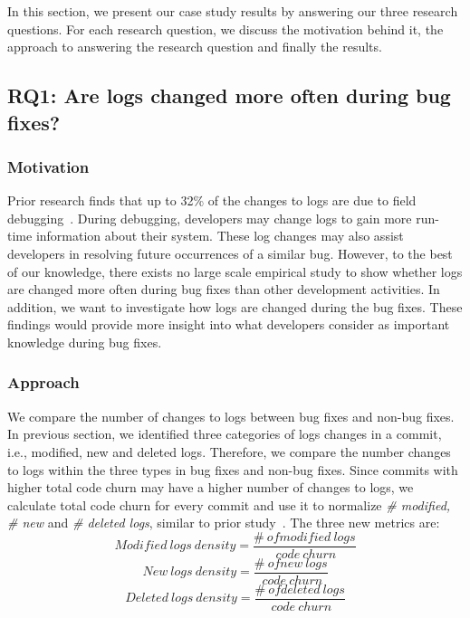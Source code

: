 	In this section, we present our case study results by answering our three research questions. For each research question, we discuss the motivation behind it, the approach to answering the research question and finally the results.

\subsection*{RQ1: Are logs changed more often during bug fixes?}


\subsubsection*{Motivation}

Prior research finds that up to 32\% of the changes to logs are due to field debugging~\cite{EMSEIAN}. During debugging, developers may change logs to gain more run-time information about their system. These log changes may also assist developers in resolving future occurrences of a similar bug. However, to the best of our knowledge, there exists no large scale empirical study to show whether logs are changed more often during bug fixes than other development activities. In addition, we want to investigate how logs are changed during the bug fixes. These findings would provide more insight into what developers consider as important knowledge during bug fixes.

\subsubsection*{Approach}

We compare the number of changes to logs between bug fixes and non-bug fixes. In previous section, we identified three categories of logs changes in a commit, i.e., modified, new and deleted logs. Therefore, we compare the number changes to logs within the three types in bug fixes and non-bug fixes. Since commits with higher total code churn may have a higher number of changes to logs, we calculate total code churn for every commit and use it to normalize \emph{\# modified, \# new} and \emph{\# deleted logs}, similar to prior study~\cite{Characterizinglogs}. The three new metrics are:
\begin{equation}
Modified\ logs\ density = \frac{\#\ of modified\ logs}{\ code\ churn } 
\label{eq1}
\end{equation}
\begin{equation}
New\ logs\  density = \frac{\#\ of new\ logs}{\ code\ churn } 
\label{eq2}
\end{equation}
\begin{equation}
Deleted\ logs\ density = \frac{\#\ of deleted\ logs}{\ code\ churn }
\label{eq3} 
\end{equation}

